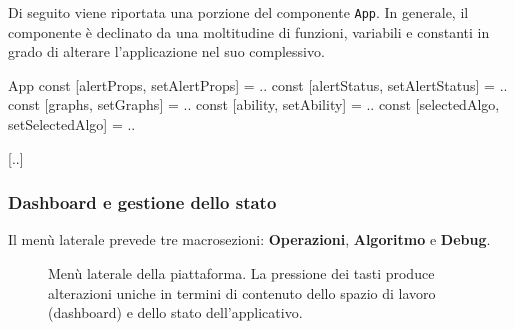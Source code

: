 \vspace{3mm}

Di seguito viene riportata una porzione del componente \verb|App|. In generale, il componente è declinato da una moltitudine di funzioni, variabili e constanti in grado di alterare l'applicazione nel suo complessivo.

\begin{sexylisting}{App}
const [alertProps, setAlertProps] = ..
const [alertStatus, setAlertStatus] = ..
const [graphs, setGraphs] = ..
const [ability, setAbility] = ..
const [selectedAlgo, setSelectedAlgo] = ..

[..]
\end{sexylisting}

\subsubsection{Dashboard e gestione dello stato}

Il menù laterale prevede tre macrosezioni: \textbf{Operazioni}, \textbf{Algoritmo} e \textbf{Debug}.

\begin{figure}[ht!]
    \centering
    \caption{Menù laterale della piattaforma. La pressione dei tasti produce alterazioni uniche in termini di contenuto dello spazio di lavoro (dashboard) e dello stato dell'applicativo.}
    \label{fig:esempio}
\end{figure}

